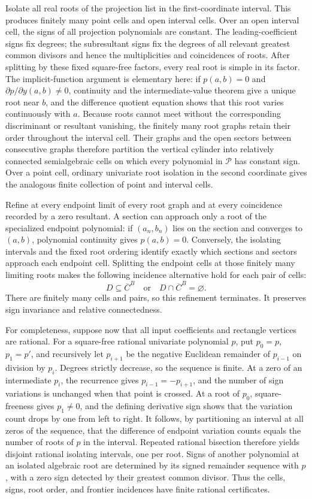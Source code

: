Isolate all real roots of the projection list in the first-coordinate interval. This produces finitely many point cells and open interval cells. Over an open interval cell, the signs of all projection polynomials are constant. The leading-coefficient signs fix degrees; the subresultant signs fix the degrees of all relevant greatest common divisors and hence the multiplicities and coincidences of roots. After splitting by these fixed square-free factors, every real root is simple in its factor. The implicit-function argument is elementary here: if \(p(a,b)=0\) and \(\partial p/\partial y(a,b)\neq0\), continuity and the intermediate-value theorem give a unique root near \(b\), and the difference quotient equation shows that this root varies continuously with \(a\). Because roots cannot meet without the corresponding discriminant or resultant vanishing, the finitely many root graphs retain their order throughout the interval cell. Their graphs and the open sectors between consecutive graphs therefore partition the vertical cylinder into relatively connected semialgebraic cells on which every polynomial in \(\mathscr P\) has constant sign. Over a point cell, ordinary univariate root isolation in the second coordinate gives the analogous finite collection of point and interval cells.

Refine at every endpoint limit of every root graph and at every coincidence recorded by a zero resultant. A section can approach only a root of the specialized endpoint polynomial: if \((a_n,b_n)\) lies on the section and converges to \((a,b)\), polynomial continuity gives \(p(a,b)=0\). Conversely, the isolating intervals and the fixed root ordering identify exactly which sections and sectors approach each endpoint cell. Splitting the endpoint cells at those finitely many limiting roots makes the following incidence alternative hold for each pair of cells:
\[
 D\subseteq\overline C^{B}
 \quad\text{or}\quad
 D\cap\overline C^{B}=\varnothing.
\]
There are finitely many cells and pairs, so this refinement terminates. It preserves sign invariance and relative connectedness.

For completeness, suppose now that all input coefficients and rectangle vertices are rational. For a square-free rational univariate polynomial \(p\), put \(p_0=p\), \(p_1=p'\), and recursively let \(p_{i+1}\) be the negative Euclidean remainder of \(p_{i-1}\) on division by \(p_i\). Degrees strictly decrease, so the sequence is finite. At a zero of an intermediate \(p_i\), the recurrence gives \(p_{i-1}=-p_{i+1}\), and the number of sign variations is unchanged when that point is crossed. At a root of \(p_0\), square-freeness gives \(p_1\neq0\), and the defining derivative sign shows that the variation count drops by one from left to right. It follows, by partitioning an interval at all zeros of the sequence, that the difference of endpoint variation counts equals the number of roots of \(p\) in the interval. Repeated rational bisection therefore yields disjoint rational isolating intervals, one per root. Signs of another polynomial at an isolated algebraic root are determined by its signed remainder sequence with \(p\), with a zero sign detected by their greatest common divisor. Thus the cells, signs, root order, and frontier incidences have finite rational certificates.

